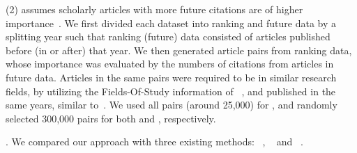 \noindent
(2) \fcita assumes scholarly articles with more future citations are of higher importance~\cite{Wang13AAAI,Wang16TIST,Li08TSRanking}.
We first divided each dataset into ranking and future data by a splitting year such that ranking (future) data consisted of articles published before (in or after) that year. We then generated article pairs from ranking data, whose importance was evaluated by the numbers of citations from articles in future data.
Articles in the same pairs were required to be in similar research fields, by utilizing the Fields-Of-Study information of \magdata~\cite{Sinha15:MAG}, and published in the same years, similar to~\cite{Wang16TIST}.
We used all pairs (around 25,000) for \aan, and randomly selected 300,000 pairs for both \aminer and \magdata, respectively.





.
We compared our approach \ensemblerank with three existing methods: \pagerank~\cite{Brin98:PageRank}, \futurerank~\cite{sayyadi09} and \hhgrank~\cite{Liang16AAAI}.

